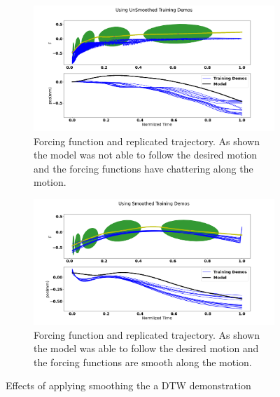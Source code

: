 \begin{figure}[h!]
    \begin{subfigure}{\textwidth} 
        \centering
        \captionsetup{justification=centering}
        \includegraphics[width=\textwidth]{images/software/unsmoothed_repruction.png}
        \caption{Forcing function and replicated trajectory. As shown the model was not able to follow the desired motion and the forcing functions have chattering along the motion.}
        \label{fig:unsmoothreplication}
    \end{subfigure}
      \begin{subfigure}{\textwidth} 
        \centering
        \captionsetup{justification=centering}
        \includegraphics[width=\textwidth]{images/software/smoothed_repruction.png}
        \caption{Forcing function and replicated trajectory. As shown the model was able to follow the desired motion and the forcing functions are smooth along the motion.}
        \label{fig:smoothreplication}
    \end{subfigure}
    \caption[DTW Smoothing]{Effects of applying smoothing the a DTW demonstration}
    \label{fig:smoothingcomparison}
\end{figure}


